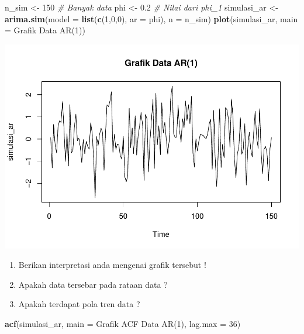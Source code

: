 \documentclass[
]{book}
\newenvironment{Shaded}{\begin{snugshade}}{\end{snugshade}}
\newcommand{\AttributeTok}[1]{\textcolor[rgb]{0.13,0.29,0.53}{#1}}
\newcommand{\CommentTok}[1]{\textcolor[rgb]{0.56,0.35,0.01}{\textit{#1}}}
\newcommand{\DecValTok}[1]{\textcolor[rgb]{0.00,0.00,0.81}{#1}}
\newcommand{\FloatTok}[1]{\textcolor[rgb]{0.00,0.00,0.81}{#1}}
\newcommand{\FunctionTok}[1]{\textcolor[rgb]{0.13,0.29,0.53}{\textbf{#1}}}
\newcommand{\NormalTok}[1]{#1}
\newcommand{\OtherTok}[1]{\textcolor[rgb]{0.56,0.35,0.01}{#1}}
\newcommand{\StringTok}[1]{\textcolor[rgb]{0.31,0.60,0.02}{#1}}
\begin{document}
\begin{Shaded}
\begin{Highlighting}[]
\NormalTok{n\_sim }\OtherTok{\textless{}{-}} \DecValTok{150} \CommentTok{\# Banyak data }
\NormalTok{phi }\OtherTok{\textless{}{-}} \FloatTok{0.2} \CommentTok{\# Nilai dari phi\_1 }
\NormalTok{simulasi\_ar }\OtherTok{\textless{}{-}} \FunctionTok{arima.sim}\NormalTok{(}\AttributeTok{model =} \FunctionTok{list}\NormalTok{(}\FunctionTok{c}\NormalTok{(}\DecValTok{1}\NormalTok{,}\DecValTok{0}\NormalTok{,}\DecValTok{0}\NormalTok{), }\AttributeTok{ar =}\NormalTok{ phi), }
                       \AttributeTok{n =}\NormalTok{ n\_sim)}
\FunctionTok{plot}\NormalTok{(simulasi\_ar, }\AttributeTok{main =} \StringTok{\textquotesingle{}Grafik Data AR(1)\textquotesingle{}}\NormalTok{)}
\end{Highlighting}
\end{Shaded}

\begin{center}\includegraphics{_main_files/figure-latex/Model AR-1} \end{center}
\begin{jp}{}{}
\begin{enumerate}
\item Berikan interpretasi anda mengenai grafik tersebut !  
\item Apakah data tersebar pada rataan data ?  
\item Apakah terdapat pola tren data ?
\end{enumerate}
\end{jp}

\begin{Shaded}
\begin{Highlighting}[]
\FunctionTok{acf}\NormalTok{(simulasi\_ar, }\AttributeTok{main =} \StringTok{\textquotesingle{}Grafik ACF Data AR(1)\textquotesingle{}}\NormalTok{, }
  \AttributeTok{lag.max =} \DecValTok{36}\NormalTok{)}
\end{Highlighting}
\end{Shaded}
\end{document}
